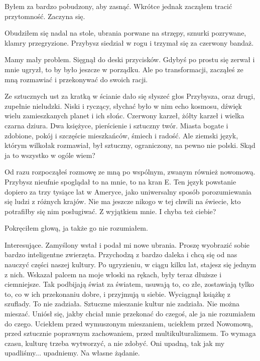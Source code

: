 Byłem za bardzo pobudzony, aby zasnąć. Wkrótce jednak zacząłem tracić przytomność. Zaczyna się.

\divider{}

Obudziłem się nadal na stole, ubrania porwane na strzępy, sznurki pozrywane, klamry przegryzione.
Przybysz siedział w rogu i trzymał się za czerwony bandaż.

\begin{dialogue}
\ds{} Mamy mały problem.
\dm{} Sięgnął do deski przycisków.
\dm{} Gdybyś po prostu się zerwał i mnie ugryzł, to by było jeszcze w porządku.
Ale po transformacji, zacząłeś ze mną rozmawiać i przekonywać do swoich racji.
\end{dialogue}

Ze sztucznych ust za kratką w ścianie dało się słyszeć głos Przybysza, oraz drugi, zupełnie nieludzki.
Niski i ryczący, słychać było w nim echo kosmosu, dźwięk wielu zamieszkanych planet i ich słońc.
Czerwony karzeł, żółty karzeł i wielka czarna dziura. 
Dwa księżyce, pierścienie i sztuczny twór.
Miasta bogate i zdobione, pokój i szczęście mieszkańców, śmiech i radość.
Ale ziemski język, którym wilkołak rozmawiał, był sztuczny, ograniczony, na pewno nie polski.
Skąd ja to wszystko w ogóle wiem?

\begin{dialogue}
\ds{} Od razu rozpocząłeś rozmowę ze mną po wspólnym, zwanym również nowomową. 
\dm{} Przybysz nieufnie spoglądał to na mnie, to na kran E. 
\dm{} Ten język powstanie dopiero za trzy tysiące lat w Ameryce, jako uniwersalny sposób porozumiewania się ludzi z różnych krajów.
Nie ma jeszcze nikogo w tej chwili na świecie, kto potrafiłby się nim posługiwać.
Z wyjątkiem mnie. I chyba też ciebie?
\end{dialogue}

Pokręciłem głową, ja także go nie rozumiałem.

\begin{dialogue}
\ds{} Interesujące.
\dm{} Zamyślony wstał i podał mi nowe ubrania.
\dm{} Proszę wyobrazić sobie bardzo inteligentne zwierzęta. 
Przychodzą z bardzo daleka i chcą się od nas nauczyć części naszej kultury.
Po ugryzieniu, w ciągu kilku lat, stajesz się jednym z nich. 
\dm{} Wskazał palcem na moje włoski na rękach, były teraz dłuższe i ciemniejsze.
\dm{} Tak podbijają świat za światem, usuwają to, co złe, zostawiają tylko to, co w ich przekonaniu dobre, i przyjmują u siebie.
\dm{} Wyciągnął książkę z szuflady.
\dm{} To nie zadziała. Sztuczne mieszanie kultur nie zadziała. Nie można mieszać.
\dm{} Uniósł się, jakby chciał mnie przekonać do czegoś, ale ja nie rozumiałem do czego.
\dm{} Uciekłem przed wymuszonym mieszaniem, uciekłem przed Nowomową, przed sztucznie poprawnym zachowaniem, przed multikulturalizmem.
To wymaga czasu, kulturę trzeba wytworzyć, a nie zdobyć.
Oni upadną, tak jak my upadliśmy... upadniemy. Na własne żądanie.
\end{dialogue}

